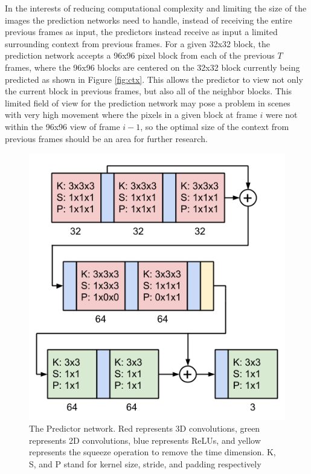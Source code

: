 \documentclass[10pt,twocolumn,letterpaper]{article}
\begin{document}
In the interests of reducing computational complexity and limiting the size of the images the prediction networks need to handle, instead of receiving the entire previous frames as input, the predictors instead receive as input a limited surrounding context from previous frames. For a given 32x32 block, the prediction network accepts a 96x96 pixel block from each of the previous $T$ frames, where the 96x96 blocks are centered on the 32x32 block currently being predicted as shown in Figure \ref{fig:ctx}. This allows the predictor to view not only the current block in previous frames, but also all of the neighbor blocks. This limited field of view for the prediction network may pose a problem in scenes with very high movement where the pixels in a given block at frame $i$ were not within the 96x96 view of frame $i - 1$, so the optimal size of the context from previous frames should be an area for further research.

\begin{figure}[t]
\begin{center}
  \includegraphics[width=0.8\linewidth]{pred_net}
\end{center}
   \caption{The Predictor network. Red represents 3D convolutions, green represents 2D convolutions, blue represents ReLUs, and yellow represents the squeeze operation to remove the time dimension. K, S, and P stand for kernel size, stride, and padding respectively}
   \label{fig:pred}
\end{figure}
\end{document}
